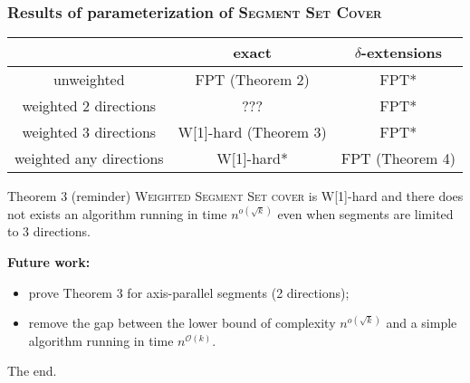 \documentclass{beamer}
\begin{document}
\begin{frame}
\frametitle{Results of parameterization of \textsc{Segment Set Cover}}

\begin{tabular}{|c|c|c|}
\hline
           & exact & $\delta$-extensions \\
\hline
unweighted & \textcolor{olivegreen}{FPT (Theorem 2)} & \textcolor{olivegreen}{FPT*} \\
\hline
weighted 2 directions & ??? & \textcolor{olivegreen}{FPT*} \\
\hline
weighted 3 directions & \textcolor{olivegreen}{W[1]-hard (Theorem 3)} &  \textcolor{olivegreen}{FPT*}\\
\hline
weighted any directions & \textcolor{olivegreen}{W[1]-hard*} &  \textcolor{olivegreen}{FPT (Theorem 4)}\\
\hline
\end{tabular}

\end{frame}


\begin{frame}
\begin{block}{Theorem 3 (reminder)}
	\textsc{Weighted Segment Set cover} is W[1]-hard
	and there does not exists an algorithm running in time $n^{o(\sqrt{k})}$
	even when segments are limited to 3 directions.
\end{block}
\bigskip

\textbf{Future work:}
\begin{itemize}
\item prove Theorem 3 for axis-parallel segments (2 directions);
\item remove the gap between the lower bound of complexity $n^{o(\sqrt{k})}$
and a simple algorithm running in time $n^{\mathcal{O}(k)}$.
\end{itemize}
\end{frame}

\begin{frame}
\begin{center}
The end.
\end{center}
\end{frame}

\end{document}
